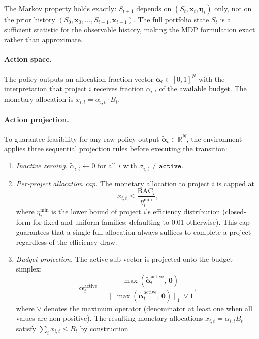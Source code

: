 The Markov property holds exactly: $S_{t+1}$ depends on
$(S_t, \mathbf{x}_t, \boldsymbol{\eta}_t)$ only, not on the prior
history $(S_0, \mathbf{x}_0, \ldots, S_{t-1}, \mathbf{x}_{t-1})$.
The full portfolio state $S_t$ is a sufficient statistic for the
observable history, making the MDP formulation exact rather than
approximate.

\paragraph{Action space.}
The policy outputs an allocation fraction vector
$\boldsymbol{\alpha}_t \in [0,1]^N$ with the interpretation that
project $i$ receives fraction $\alpha_{i,t}$ of the available budget.
The monetary allocation is $x_{i,t} = \alpha_{i,t} \cdot B_t$.

\paragraph{Action projection.}
To guarantee feasibility for any raw policy output
$\tilde{\boldsymbol{\alpha}}_t \in \mathbb{R}^N$, the environment
applies three sequential projection rules before executing the
transition:

\begin{enumerate}[label=(\roman*)]
  \item \emph{Inactive zeroing.}
    $\tilde{\alpha}_{i,t} \leftarrow 0$ for all $i$ with
    $\sigma_{i,t} \neq \texttt{active}$.

  \item \emph{Per-project allocation cap.}
    The monetary allocation to project $i$ is capped at
    \begin{equation}
      x_{i,t} \leq \frac{\mathrm{BAC}_i}{\eta^{\min}_i},
      \label{eq:alloc_cap}
    \end{equation}
    where $\eta^{\min}_i$ is the lower bound of project $i$'s
    efficiency distribution (closed-form for fixed and uniform
    families; defaulting to 0.01 otherwise). This cap guarantees
    that a single full allocation always suffices to complete a
    project regardless of the efficiency draw.

  \item \emph{Budget projection.}
    The active sub-vector is projected onto the budget simplex:
    \begin{equation}
      \boldsymbol{\alpha}_t^{\mathrm{active}}
        = \frac{\max(\tilde{\boldsymbol{\alpha}}_t^{\mathrm{active}},\,\mathbf{0})}
               {\bigl\|\max(\tilde{\boldsymbol{\alpha}}_t^{\mathrm{active}},\,
                 \mathbf{0})\bigr\|_1 \vee 1},
      \label{eq:projection}
    \end{equation}
    where $\vee$ denotes the maximum operator (denominator at least
    one when all values are non-positive). The resulting monetary
    allocations $x_{i,t} = \alpha_{i,t} B_t$ satisfy
    $\sum_i x_{i,t} \leq B_t$ by construction.
\end{enumerate}

